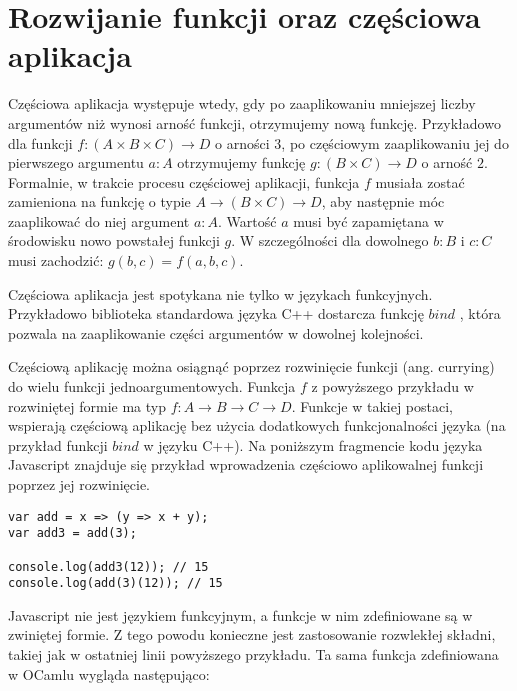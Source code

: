 \documentclass[declaration,shortabstract]{iithesis}
\begin{document}

\section{Rozwijanie funkcji oraz częściowa aplikacja}

Częściowa aplikacja występuje wtedy, gdy po zaaplikowaniu mniejszej liczby 
argumentów niż wynosi arność funkcji, otrzymujemy nową funkcję. Przykładowo 
dla funkcji $f: (A \times B \times C) \rightarrow D$ o arności $3$,
po częściowym zaaplikowaniu jej do pierwszego 
argumentu $a : A$ otrzymujemy funkcję $g : (B \times C) \rightarrow D$ o arność $2$.
Formalnie, w trakcie procesu częściowej aplikacji,
funkcja $f$ musiała zostać zamieniona na funkcję o typie
$A \rightarrow (B \times C) \rightarrow D$, aby następnie móc zaaplikować do niej 
argument $a : A$. Wartość $a$ musi być zapamiętana w środowisku nowo powstałej 
funkcji $g$.
W szczególności
dla dowolnego $b : B$ i $c : C$  musi zachodzić: $g(b, c) = f(a, b, c)$. 

Częściowa aplikacja jest spotykana nie tylko w językach funkcyjnych. 
Przykładowo biblioteka standardowa języka C++ dostarcza funkcję
$bind$ \cite{cpp_bind}, która pozwala na zaaplikowanie części argumentów
w dowolnej kolejności. 

Częściową aplikację można osiągnąć poprzez rozwinięcie funkcji (ang. currying) 
do wielu funkcji jednoargumentowych. Funkcja $f$ z powyższego przykładu 
w rozwiniętej
formie ma typ $f : A \rightarrow B \rightarrow C \rightarrow D$. Funkcje w 
takiej postaci, wspierają częściową aplikację bez użycia dodatkowych 
funkcjonalności języka (na przykład funkcji $bind$ w języku C++).
Na poniższym fragmencie kodu języka Javascript
znajduje się przykład wprowadzenia częściowo aplikowalnej funkcji 
poprzez jej rozwinięcie.

\begin{lstlisting}[frame=lines]
var add = x => (y => x + y);
var add3 = add(3);

console.log(add3(12)); // 15
console.log(add(3)(12)); // 15
\end{lstlisting}

Javascript nie jest językiem funkcyjnym, a funkcje w nim zdefiniowane są w 
zwiniętej formie. Z tego powodu konieczne jest zastosowanie rozwlekłej składni,
takiej jak w ostatniej linii powyższego przykładu. Ta sama funkcja 
zdefiniowana w OCamlu wygląda następująco:
\end{document}
